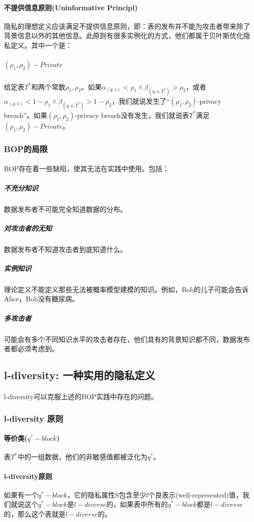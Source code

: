 \documentclass[12pt,a4paper]{article}
\begin{document}
\paragraph{不提供信息原则(Uninformative Principl)} 隐私的理想定义应该满足不提供信息原则，即：表的发布并不能为攻击者带来除了背景信息以外的其他信息。此原则有很多实例化的方式，他们都属于贝叶斯优化隐私定义。其中一个是：
	\subparagraph{$(\rho_1, \rho_2)-Private$} 给定表$T^*$和两个常数$\rho_1,\rho_2$。如果$\alpha_{(q,s)} < \rho_1 \wedge \beta_{(q,s,T^*)} > \rho_2$，或者$\alpha_{(q,s)} < 1 - \rho_1 \wedge \beta_{(q,s,T^*)} > 1 - \rho_2$，我们就说发生了“$(\rho_1, \rho_2)$-privacy breach”。如果$(\rho_1, \rho_2)$-privacy breach没有发生，我们就说表$T^*$满足$(\rho_1, \rho_2)-Private$。

\subsubsection{BOP的局限}
	
\paragraph{} BOP存在着一些缺陷，使其无法在实践中使用。包括：
	\subparagraph{不充分知识} 数据发布者不可能完全知道数据的分布。
	\subparagraph{对攻击者的无知} 数据发布者不知道攻击者到底知道什么。
	\subparagraph{实例知识} 理论定义不能定义那些无法被概率模型建模的知识。例如，Bob的儿子可能会告诉Alice，Bob没有糖尿病。
	\subparagraph{多攻击者} 可能会有多个不同知识水平的攻击者存在，他们具有的背景知识都不同，数据发布者都必须考虑到。
	
\subsection{l-diversity: 一种实用的隐私定义}
\paragraph{} l-diversity可以克服上述的BOP实践中存在的问题。

\subsubsection{l-diversity 原则}
\paragraph{等价类($q^*-block$)} 表$T^*$中的一组数据，他们的非敏感值都被泛化为$q^*$。
\paragraph{l-diversity原则} 如果有一个$q^*-block$，它的隐私属性S包含至少$l$个良表示(well-represented)值，我们就说这个$q^*-block$是$l-diverse$的，如果表中所有的$q^*-block$都是$l-diverse$的，那么这个表就是$l-diverse$的。
\end{document}
